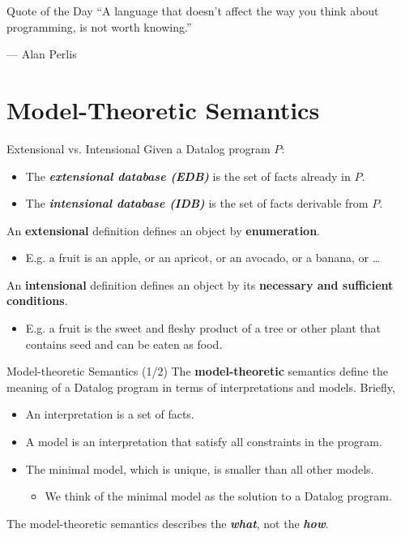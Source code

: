 \begin{frame}{Quote of the Day}
``A language that doesn't affect the way you think about programming, is not
worth knowing.''

\begin{flushright}
--- Alan Perlis
\end{flushright}
\end{frame}



\section{Model-Theoretic Semantics}

\begin{frame}{Extensional vs. Intensional}
Given a Datalog program $P$:
\begin{itemize}
    \item The \textbf{\emph{extensional database (EDB)}} is the set of facts
    already in $P$.
    \item The \textbf{\emph{intensional database (IDB)}} is the set of facts
    derivable from $P$.
\end{itemize}

\pause

An \textbf{extensional} definition defines an object by \textbf{enumeration}.
\begin{itemize}
    \item E.g. a fruit is an apple, or an apricot, or an avocado, or a banana, or …
\end{itemize}

\pause

An \textbf{intensional} definition defines an object by its \textbf{necessary
and sufficient conditions}.
\begin{itemize}
    \item E.g. a fruit is the sweet and fleshy product of a tree or other plant that contains seed and can be eaten as food.
\end{itemize}    
\end{frame}

\begin{frame}{Model-theoretic Semantics (1/2)}
The \textbf{model-theoretic} semantics define the meaning of a Datalog program
in terms of interpretations and models. Briefly,
\begin{itemize}
    \item An interpretation is a set of facts.
    \item A model is an interpretation that satisfy all constraints in the program.
    \item The minimal model, which is unique, is smaller than all other models.
        \begin{itemize}
            \item We think of the minimal model as the solution to a Datalog program.
        \end{itemize}
\end{itemize}

\pause

The model-theoretic semantics describes the \textbf{\emph{what}}, not the
\textbf{\emph{how}}.
\end{frame}

